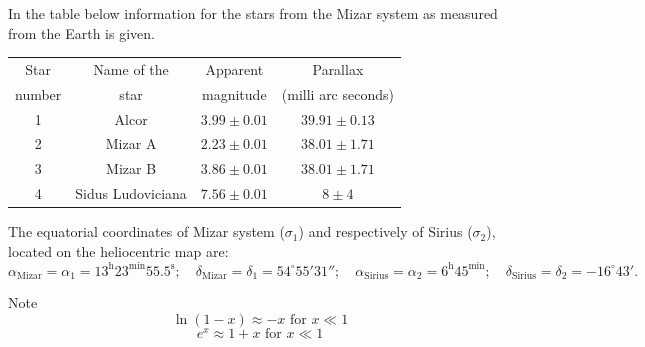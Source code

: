 In the table below information for the stars from the Mizar system as
measured from the Earth is given.

\begin{center}
\begin{tabular}{cccc}
\hline
Star & Name of the & Apparent & Parallax \\
number & star & magnitude & (milli arc seconds) \\
\hline
1 & Alcor & $3.99 \pm 0.01$ & $39.91 \pm 0.13$ \\
2 & Mizar A & $2.23 \pm 0.01$ & $38.01 \pm 1.71$ \\
3 & Mizar B & $3.86 \pm 0.01$ & $38.01 \pm 1.71$ \\
4 & Sidus Ludoviciana & $7.56 \pm 0.01$ & $8 \pm 4$ \\
\hline
\end{tabular}
\end{center}

The equatorial coordinates of Mizar system ($\sigma_1$) and respectively of
Sirius ($\sigma_2$), located on the heliocentric map are:
\[ \alpha_{\mathrm{Mizar}} = \alpha_1 =
   13^{\mathrm{h}}23^{\mathrm{min}}55.5^{\mathrm{s}}; \quad
   \delta_{\mathrm{Mizar}} = \delta_1 = 54^\circ 55' 31''; \quad
   \alpha_{\mathrm{Sirius}} = \alpha_2 = 6^{\mathrm{h}}45^{\mathrm{min}};
   \quad
   \delta_{\mathrm{Sirius}} = \delta_2 = -16^\circ 43'. \]

Note
\[ \ln(1-x) \approx -x \text{ for } x \ll 1 \]
\[ e^x \approx 1 + x \text{ for } x \ll 1 \]
